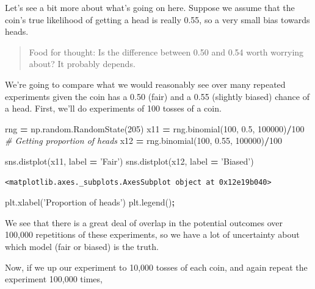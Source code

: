 \documentclass[
  letterpaper,
]{scrbook}
\newenvironment{Shaded}{\begin{snugshade}}{\end{snugshade}}
\newcommand{\CommentTok}[1]{\textcolor[rgb]{0.56,0.35,0.01}{\textit{#1}}}
\newcommand{\DecValTok}[1]{\textcolor[rgb]{0.00,0.00,0.81}{#1}}
\newcommand{\FloatTok}[1]{\textcolor[rgb]{0.00,0.00,0.81}{#1}}
\newcommand{\NormalTok}[1]{#1}
\newcommand{\OperatorTok}[1]{\textcolor[rgb]{0.81,0.36,0.00}{\textbf{#1}}}
\newcommand{\StringTok}[1]{\textcolor[rgb]{0.31,0.60,0.02}{#1}}
\begin{document}
Let's see a bit more about what's going on here. Suppose we assume that the coin's true likelihood of getting a head is really 0.55, so a very small bias towards heads.

\begin{quote}
Food for thought: Is the difference between 0.50 and 0.54 worth worrying about? It probably depends.
\end{quote}

We're going to compare what we would reasonably see over many repeated experiments given the coin has a 0.50 (fair) and a 0.55 (slightly biased) chance of a head. First, we'll do experiments of 100 tosses of a coin.

\begin{Shaded}
\begin{Highlighting}[]
\NormalTok{rng }\OperatorTok{=}\NormalTok{ np.random.RandomState(}\DecValTok{205}\NormalTok{)}
\NormalTok{x11 }\OperatorTok{=}\NormalTok{ rng.binomial(}\DecValTok{100}\NormalTok{, }\FloatTok{0.5}\NormalTok{, }\DecValTok{100000}\NormalTok{)}\OperatorTok{/}\DecValTok{100} \CommentTok{# Getting proportion of heads}
\NormalTok{x12 }\OperatorTok{=}\NormalTok{ rng.binomial(}\DecValTok{100}\NormalTok{, }\FloatTok{0.55}\NormalTok{, }\DecValTok{100000}\NormalTok{)}\OperatorTok{/}\DecValTok{100} 

\NormalTok{sns.distplot(x11, label }\OperatorTok{=} \StringTok{'Fair'}\NormalTok{)}
\NormalTok{sns.distplot(x12, label }\OperatorTok{=} \StringTok{'Biased'}\NormalTok{)}
\end{Highlighting}
\end{Shaded}

\begin{verbatim}
<matplotlib.axes._subplots.AxesSubplot object at 0x12e19b040>
\end{verbatim}

\begin{Shaded}
\begin{Highlighting}[]
\NormalTok{plt.xlabel(}\StringTok{'Proportion of heads'}\NormalTok{)}
\NormalTok{plt.legend()}\OperatorTok{;}
\end{Highlighting}
\end{Shaded}

We see that there is a great deal of overlap in the potential outcomes over 100,000 repetitions of these experiments, so we have a lot of uncertainty about which model (fair or biased) is the truth.

Now, if we up our experiment to 10,000 tosses of each coin, and again repeat the experiment 100,000 times,
\end{document}
